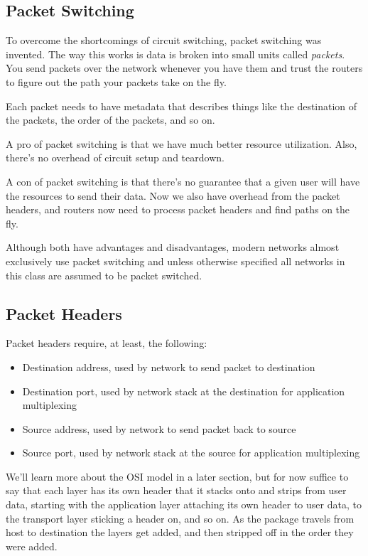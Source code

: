 \subsection{Packet Switching}
To overcome the shortcomings of circuit switching, packet switching was invented.
The way this works is data is broken into small units called \emph{packets}.
You send packets over the network whenever you have them and trust the routers
to figure out the path your packets take on the fly.

Each packet needs to have metadata that describes things like the destination
of the packets, the order of the packets, and so on.

A pro of packet switching is that we have much better resource utilization.
Also, there's no overhead of circuit setup and teardown.

A con of packet switching is that there's no guarantee that a given user
will have the resources to send their data. Now we also have overhead from
the packet headers, and routers now need to process packet headers and find paths
on the fly.

Although both have advantages and disadvantages, modern networks almost
exclusively use packet switching and unless otherwise specified all
networks in this class are assumed to be packet switched.

\subsection{Packet Headers}
Packet headers require, at least, the following:
\begin{itemize}
    \item Destination address, used by network to send packet to destination
    \item Destination port, used by network stack at the destination for
          application multiplexing
    \item Source address, used by network to send packet back to source
    \item Source port, used by network stack at the source for application
          multiplexing
\end{itemize}

We'll learn more about the OSI model in a later section, but for now suffice
to say that each layer has its own header that it stacks onto and strips
from user data, starting with the application layer attaching its own
header to user data, to the transport layer sticking a header on, and so on.
As the package travels from host to destination the layers get added, and
then stripped off in the order they were added.